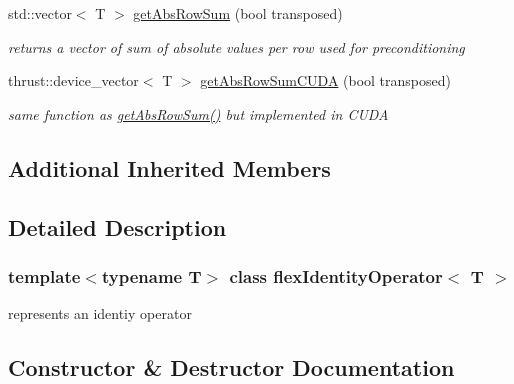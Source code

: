 \begin{DoxyCompactItemize}
std\+::vector$<$ T $>$ \hyperlink{classflex_identity_operator_afe7f2f91fc5f563c2261937f272c0255}{get\+Abs\+Row\+Sum} (bool transposed)
\begin{DoxyCompactList}\small\item\em returns a vector of sum of absolute values per row used for preconditioning \end{DoxyCompactList}\item 
thrust\+::device\+\_\+vector$<$ T $>$ \hyperlink{classflex_identity_operator_ae12ebab61f7f39b0d1f636ad1d27c77a}{get\+Abs\+Row\+Sum\+C\+U\+DA} (bool transposed)
\begin{DoxyCompactList}\small\item\em same function as \hyperlink{classflex_identity_operator_afe7f2f91fc5f563c2261937f272c0255}{get\+Abs\+Row\+Sum()} but implemented in C\+U\+DA \end{DoxyCompactList}\end{DoxyCompactItemize}
\subsection*{Additional Inherited Members}


\subsection{Detailed Description}
\subsubsection*{template$<$typename T$>$\newline
class flex\+Identity\+Operator$<$ T $>$}

represents an identiy operator 

\subsection{Constructor \& Destructor Documentation}
\mbox{\label{classflex_identity_operator_acd55573556fc2313b0280f54c7a6730a}} 
